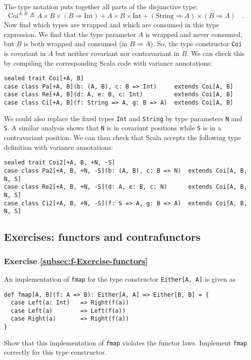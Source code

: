 The type notation puts together all parts of the disjunctive type:
\[
\text{Coi}^{A,B}\triangleq A\times B\times(B\Rightarrow\text{Int})+A\times B\times\text{Int}+(\text{String}\Rightarrow A)\times(B\Rightarrow A)\quad.
\]
Now find which types are wrapped and which are consumed in this type
expression. We find that the type parameter $A$ is wrapped and never
consumed, but $B$ is both wrapped and consumed (in $B\Rightarrow A$).
So, the type constructor \lstinline!Coi! is covariant in $A$ but
neither covariant nor contravariant in $B$. We can check this by
compiling the corresponding Scala code with variance annotations:
\begin{lstlisting}
sealed trait Coi[+A, B]
case class Pa[+A, B](b: (A, B), c: B => Int)     extends Coi[A, B]
case class Re[+A, B](d: A, e: B, c: Int)         extends Coi[A, B]
case class Ci[+A, B](f: String => A, g: B => A)  extends Coi[A, B]
\end{lstlisting}
We could also replace the fixed types \lstinline!Int! and \lstinline!String!
by type parameters \lstinline!N! and \lstinline!S!. A similar analysis
shows that \lstinline!N! is in covariant positions while \lstinline!S!
is in a contravariant position. We can then check that Scala accepts
the following type definition with variance annotations:
\begin{lstlisting}
sealed trait Coi2[+A, B, +N, -S]
case class Pa2[+A, B, +N, -S](b: (A, B), c: B => N)  extends Coi[A, B, N, S]
case class Re2[+A, B, +N, -S](d: A, e: B, c: N)      extends Coi[A, B, N, S]
case class Ci2[+A, B, +N, -S](f: S => A, g: B => A)  extends Coi[A, B, N, S]
\end{lstlisting}


\subsection{Exercises: functors and contrafunctors}

\subsubsection{Exercise \label{subsec:f-Exercise-functors}\ref{subsec:f-Exercise-functors}}

An implementation of \lstinline!fmap! for the type constructor \lstinline!Either[A, A]!
is given as
\begin{lstlisting}
def fmap[A, B](f: A => B): Either[A, A] => Either[B, B] = {
  case Left(a: Int)   => Right(f(a))
  case Left(a)        => Left(f(a))
  case Right(a)       => Right(f(a))
}
\end{lstlisting}
Show that this implementation of \lstinline!fmap! violates the functor
laws. Implement \lstinline!fmap! correctly for this type constructor.

